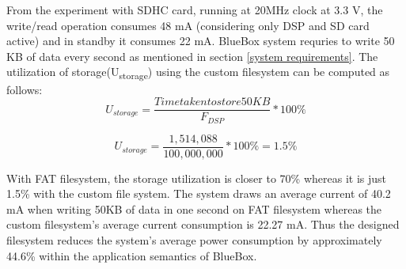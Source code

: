 From the experiment with SDHC card, running at 20MHz clock at 3.3 V, the write/read operation consumes 48 mA (considering only DSP and SD card active) and in standby it consumes 22 mA. BlueBox system requries to write 50 KB of data every second as mentioned in section \ref{system requirements}. The utilization of storage(U\textsubscript{storage}) using the custom filesystem can be computed as follows:
 \[U_{storage} = \frac{Time taken to store 50 KB}{
	F_{DSP}
} * 100 \%\]

 \[U_{storage} = \frac{1,514,088}{
	100,000,000
} * 100 \% = 1.5\%\]

 With FAT filesystem, the storage utilization is closer to 70\% whereas it is just 1.5\% with the custom file system.
 The system draws an average current of 40.2 mA when writing 50KB of data in one second on FAT filesystem whereas the custom filesystem's average current consumption is 22.27 mA. Thus the designed filesystem reduces the system's average power consumption by approximately 44.6\% within the application semantics of BlueBox. 
 
